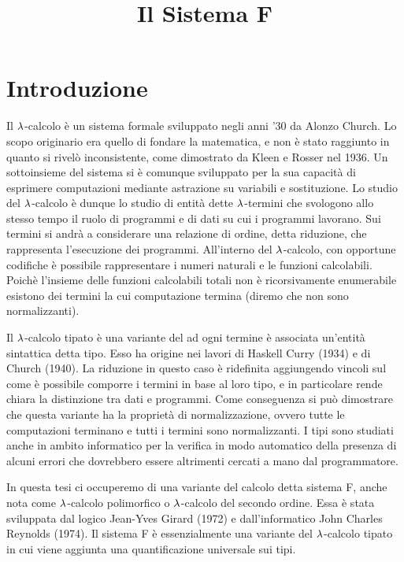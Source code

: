 \documentclass[]{marticle}
\title{\textbf{\huge Il Sistema F}}
\date{}
\begin{document}
\maketitle

\section{Introduzione}

Il $\lambda$-calcolo \`e un sistema formale sviluppato negli anni '30 da Alonzo
Church. Lo scopo originario era quello di fondare la matematica, e non \`e stato
raggiunto in quanto si rivel\`o inconsistente, come dimostrato da Kleen e Rosser
nel 1936. Un sottoinsieme del sistema si \`e comunque sviluppato per la sua
capacit\`a di esprimere computazioni mediante astrazione su variabili e
sostituzione. Lo studio del $\lambda$-calcolo \`e dunque lo studio di entit\`a dette
$\lambda$-termini che svologono allo stesso tempo il ruolo di programmi e di dati su
cui i programmi lavorano. Sui termini si andr\`a a considerare una relazione di
ordine, detta riduzione, che rappresenta l'esecuzione dei programmi. All'interno
del $\lambda$-calcolo, con opportune codifiche \`e possibile rappresentare i numeri
naturali e le funzioni calcolabili. Poich\`e l'insieme delle funzioni
calcolabili totali non \`e ricorsivamente enumerabile esistono dei termini la
cui computazione termina (diremo che non sono normalizzanti).

Il $\lambda$-calcolo tipato \`e una variante del ad ogni termine \`e associata
un'entit\`a sintattica detta tipo. Esso ha origine nei lavori di Haskell Curry
(1934) e di Church (1940).  La riduzione in questo caso \`e ridefinita
aggiungendo vincoli sul come \`e possibile comporre i termini in base al loro
tipo, e in particolare rende chiara la distinzione tra dati e programmi. Come
conseguenza si pu\`o dimostrare che questa variante ha la propriet\`a di
normalizzazione, ovvero tutte le computazioni terminano e tutti i termini sono
normalizzanti. I tipi sono studiati anche in ambito informatico per la
verifica in modo automatico della presenza di alcuni errori che dovrebbero
essere altrimenti cercati a mano dal programmatore.

In questa tesi ci occuperemo di una variante del calcolo detta sistema F, anche
nota come $\lambda$-calcolo polimorfico o $\lambda$-calcolo del secondo ordine. Essa \`e
stata sviluppata dal logico Jean-Yves Girard (1972) e dall'informatico John
Charles Reynolds (1974). Il sistema F \`e essenzialmente una variante del
$\lambda$-calcolo tipato in cui viene aggiunta una quantificazione universale sui
tipi.
\end{document}
